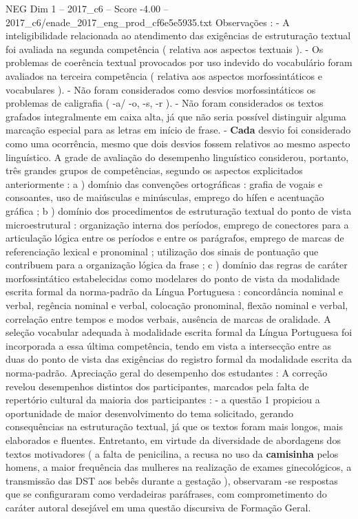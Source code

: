 \begin{textsample}{NEG Dim 1 – 2017\_c6 – Score -4.00 – 2017\_c6/enade\_2017\_eng\_prod\_cf6e5e5935.txt}
Observações : - A inteligibilidade relacionada ao atendimento das exigências de estruturação textual foi avaliada na segunda competência ( relativa aos aspectos textuais ). - Os problemas de coerência textual provocados por uso indevido do vocabulário foram avaliados na terceira competência ( relativa aos aspectos morfossintáticos e vocabulares ). - Não foram considerados como desvios morfossintáticos os problemas de caligrafia ( -a/ -o, -s, -r ). - Não foram considerados os textos grafados integralmente em caixa alta, já que não seria possível distinguir alguma marcação especial para as letras em início de frase. - \textbf{Cada} desvio foi considerado como uma ocorrência, mesmo que dois desvios fossem relativos ao mesmo aspecto linguístico.
A grade de avaliação do desempenho linguístico considerou, portanto, três grandes grupos de competências, segundo os aspectos explicitados anteriormente : a ) domínio das convenções ortográficas : grafia de vogais e consoantes, uso de maiúsculas e minúsculas, emprego do hífen e acentuação gráfica ; b ) domínio dos procedimentos de estruturação textual do ponto de vista microestrutural : organização interna dos períodos, emprego de conectores para a articulação lógica entre os períodos e entre os parágrafos, emprego de marcas de referenciação lexical e pronominal ; utilização dos sinais de pontuação que contribuem para a organização lógica da frase ; c ) domínio das regras de caráter morfossintático estabelecidas como modelares do ponto de vista da modalidade escrita formal da norma-padrão da Língua Portuguesa : concordância nominal e verbal, regência nominal e verbal, colocação pronominal, flexão nominal e verbal, correlação entre tempos e modos verbais, ausência de marcas de oralidade.
A seleção vocabular adequada à modalidade escrita formal da Língua Portuguesa foi incorporada a essa última competência, tendo em vista a intersecção entre as duas do ponto de vista das exigências do registro formal da modalidade escrita da norma-padrão.
Apreciação geral do desempenho dos estudantes : A correção revelou desempenhos distintos dos participantes, marcados pela falta de repertório cultural da maioria dos participantes : - a questão 1 propiciou a oportunidade de maior desenvolvimento do tema solicitado, gerando consequências na estruturação textual, já que os textos foram mais longos, mais elaborados e fluentes.
Entretanto, em virtude da diversidade de abordagens dos textos motivadores ( a falta de penicilina, a recusa no uso da \textbf{camisinha} pelos homens, a maior frequência das mulheres na realização de exames ginecológicos, a transmissão das DST aos bebês durante a gestação ), observaram -se respostas que se configuraram como verdadeiras paráfrases, com comprometimento do caráter autoral desejável em uma questão discursiva de Formação Geral.

\end{textsample}
